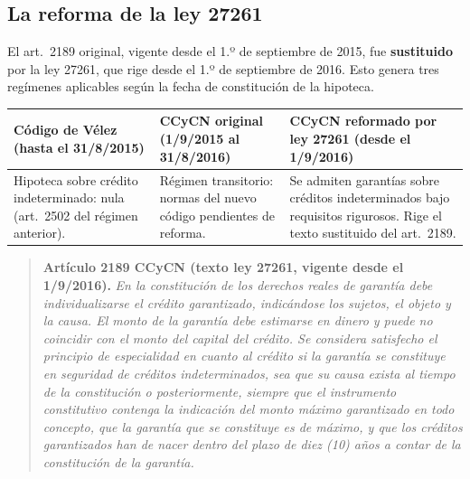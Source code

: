 \documentclass[12pt,oneside]{book}
\begin{document}
\subsection{La reforma de la ley 27261}

El art.~2189 original, vigente desde el 1.º de septiembre de 2015, fue \textbf{sustituido} por la ley 27261, que rige desde el 1.º de septiembre de 2016. Esto genera tres regímenes aplicables según la fecha de constitución de la hipoteca.

\begin{table}[H]
\centering
\begin{tabularx}{\textwidth}{@{}LLL@{}}
\toprule
\textbf{Código de Vélez (hasta el 31/8/2015)} & \textbf{CCyCN original (1/9/2015 al 31/8/2016)} & \textbf{CCyCN reformado por ley 27261 (desde el 1/9/2016)} \\
\midrule
Hipoteca sobre crédito indeterminado: nula (art.~2502 del régimen anterior). & Régimen transitorio: normas del nuevo código pendientes de reforma. & Se admiten garantías sobre créditos indeterminados bajo requisitos rigurosos. Rige el texto sustituido del art.~2189. \\
\bottomrule
\end{tabularx}
\end{table}

\begin{quote}
\textbf{Artículo 2189 CCyCN (texto ley 27261, vigente desde el 1/9/2016).} \textit{En la constitución de los derechos reales de garantía debe individualizarse el crédito garantizado, indicándose los sujetos, el objeto y la causa. El monto de la garantía debe estimarse en dinero y puede no coincidir con el monto del capital del crédito. Se considera satisfecho el principio de especialidad en cuanto al crédito si la garantía se constituye en seguridad de créditos indeterminados, sea que su causa exista al tiempo de la constitución o posteriormente, siempre que el instrumento constitutivo contenga la indicación del monto máximo garantizado en todo concepto, que la garantía que se constituye es de máximo, y que los créditos garantizados han de nacer dentro del plazo de diez (10) años a contar de la constitución de la garantía.}
\end{quote}
\end{document}
